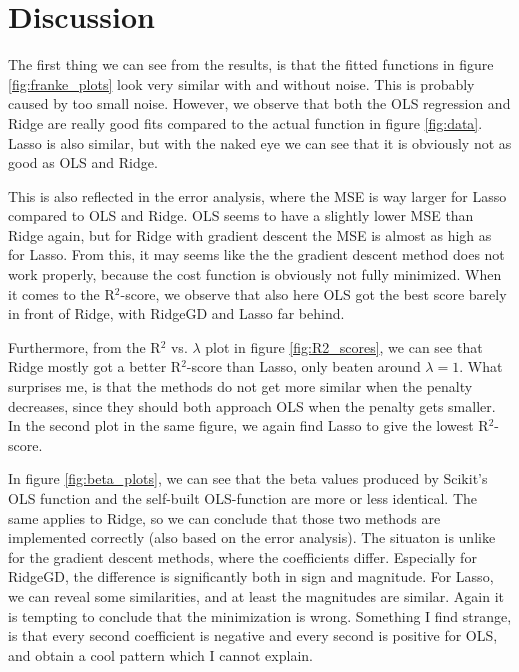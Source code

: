\section{Discussion} \label{sec:discussion}
The first thing we can see from the results, is that the fitted functions in figure \eqref{fig:franke_plots} look very similar with and without noise. This is probably caused by too small noise. However, we observe that both the OLS regression and Ridge are really good fits compared to the actual function in figure \eqref{fig:data}. Lasso is also similar, but with the naked eye we can see that it is obviously not as good as OLS and Ridge. 

This is also reflected in the error analysis, where the MSE is way larger for Lasso compared to OLS and Ridge. OLS seems to have a slightly lower MSE than Ridge again, but for Ridge with gradient descent the MSE is almost as high as for Lasso. From this, it may seems like the the gradient descent method does not work properly, because the cost function is obviously not fully minimized. When it comes to the R$^2$-score, we observe that also here OLS got the best score barely in front of Ridge, with RidgeGD and Lasso far behind. 

Furthermore, from the R$^2$ vs. $\lambda$ plot in figure \eqref{fig:R2_scores}, we can see that Ridge mostly got a better R$^2$-score than Lasso, only beaten around $\lambda=1$. What surprises me, is that the methods do not get more similar when the penalty decreases, since they should both approach OLS when the penalty gets smaller. In the second plot in the same figure, we again find Lasso to give the lowest R$^2$-score. 

In figure \eqref{fig:beta_plots}, we can see that the beta values produced by Scikit's OLS function and the self-built OLS-function are more or less identical. The same applies to Ridge, so we can conclude that those two methods are implemented correctly (also based on the error analysis). The situaton is unlike for the gradient descent methods, where the coefficients differ. Especially for RidgeGD, the difference is significantly both in sign and magnitude. For Lasso, we can reveal some similarities, and at least the magnitudes are similar. Again it is tempting to conclude that the minimization is wrong. Something I find strange, is that every second coefficient is negative and every second is positive for OLS, and obtain a cool pattern which I cannot explain. 

\vspace{2cm}

